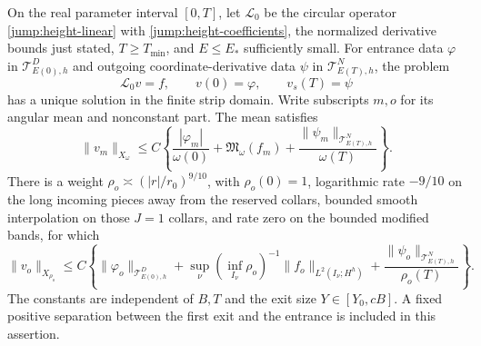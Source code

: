\begin{lemma}\label{jump:height-inverse}
On the real parameter interval $[0,T]$, let
$\mathcal L_0$ be the circular operator
\eqref{jump:height-linear} with
\eqref{jump:height-coefficients}, the normalized derivative bounds
just stated, $T\geq T_{\min}$, and $E\leq E_*$ sufficiently small.
For entrance data $\varphi$ in $\mathcal T^D_{E(0),h}$ and outgoing
coordinate-derivative data $\psi$ in $\mathcal T^N_{E(T),h}$,
the problem
\[
 \mathcal L_0v=f,\qquad v(0)=\varphi,\qquad v_s(T)=\psi
\]
has a unique solution in the finite strip domain.  Write subscripts
$m,o$ for its angular mean and nonconstant part.  The mean satisfies
\begin{equation}\label{jump:mean-inverse}
 \|v_m\|_{X_\omega}\leq C\left\{
 \frac{|\varphi_m|}{\omega(0)}
 +\mathfrak M_\omega(f_m)
 +\frac{\|\psi_m\|_{\mathcal T^N_{E(T),h}}}{\omega(T)}
 \right\}.
\end{equation}
There is a weight $\rho_o\asymp (|r|/r_0)^{9/10}$, with
$\rho_o(0)=1$, logarithmic rate $-9/10$ on the long incoming
pieces away from the reserved collars, bounded smooth interpolation
on those $J=1$ collars, and rate zero on the bounded modified bands, for which
\begin{equation}\label{jump:oscillatory-inverse}
 \|v_o\|_{X_{\rho_o}}\leq C\left\{
 \|\varphi_o\|_{\mathcal T^D_{E(0),h}}
 +\sup_\nu(\inf_{I_\nu}\rho_o)^{-1}\|f_o\|_{L^2(I_\nu;H^h)}
 +\frac{\|\psi_o\|_{\mathcal T^N_{E(T),h}}}{\rho_o(T)}
 \right\}.
\end{equation}
The constants are independent of $B,T$ and the exit size
$Y\in[Y_0,cB]$.  A fixed positive separation between the first exit
and the entrance is included in this assertion.
\end{lemma}


